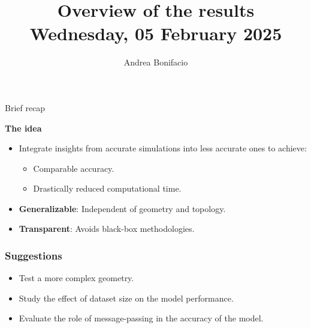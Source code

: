 \documentclass{beamer}
\title{Overview of the results\\
\tiny{Wednesday, 05 February 2025}}
\author{Andrea Bonifacio}
\date{}
\begin{document}
\begin{frame}
\titlepage
\end{frame}


\begin{frame}{Brief recap}

    \textbf{The idea}
    \begin{itemize}
        \item Integrate insights from accurate simulations into less accurate ones to achieve:
        \begin{itemize}
            \item Comparable accuracy.
            \item Drastically reduced computational time.
        \end{itemize}
        \item \textbf{Generalizable}: Independent of geometry and topology.
        \item \textbf{Transparent}: Avoids black-box methodologies.
    \end{itemize}
    
    \vspace{0.5cm}
    
    \end{frame}






\begin{frame}
\frametitle{Suggestions}
\begin{itemize}
    \item Test a more complex geometry.
    \item Study the effect of dataset size on the model performance.
    \item Evaluate the role of message-passing in the accuracy of the model.
\end{itemize}
\end{frame}
\end{document}
